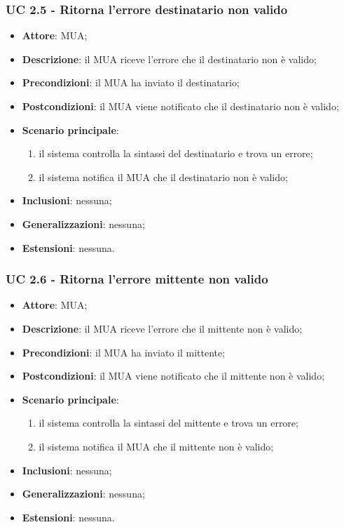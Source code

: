     \subsubsection{UC 2.5 - Ritorna l'errore destinatario non valido} \label{sec:UC2.5}
    \begin{itemize}
        \item \textbf{Attore}: MUA;
        \item \textbf{Descrizione}: il MUA riceve l'errore che il destinatario non è valido;
        \item \textbf{Precondizioni}: il MUA ha inviato il destinatario;
        \item \textbf{Postcondizioni}: il MUA viene notificato che il destinatario non è valido;
        \item \textbf{Scenario principale}:
            \begin{enumerate}
                \item il sistema controlla la sintassi del destinatario e trova un errore;
                \item il sistema notifica il MUA che il destinatario non è valido;
            \end{enumerate}
        \item \textbf{Inclusioni}: nessuna;
        \item \textbf{Generalizzazioni}: nessuna;
        \item \textbf{Estensioni}: nessuna.
    \end{itemize}

    \subsubsection{UC 2.6 - Ritorna l'errore mittente non valido} \label{sec:UC2.6}
    \begin{itemize}
        \item \textbf{Attore}: MUA;
        \item \textbf{Descrizione}: il MUA riceve l'errore che il mittente non è valido;
        \item \textbf{Precondizioni}: il MUA ha inviato il mittente;
        \item \textbf{Postcondizioni}: il MUA viene notificato che il mittente non è valido;
        \item \textbf{Scenario principale}:
            \begin{enumerate}
                \item il sistema controlla la sintassi del mittente e trova un errore;
                \item il sistema notifica il MUA che il mittente non è valido;
            \end{enumerate}
        \item \textbf{Inclusioni}: nessuna;
        \item \textbf{Generalizzazioni}: nessuna;
        \item \textbf{Estensioni}: nessuna.
    \end{itemize}
